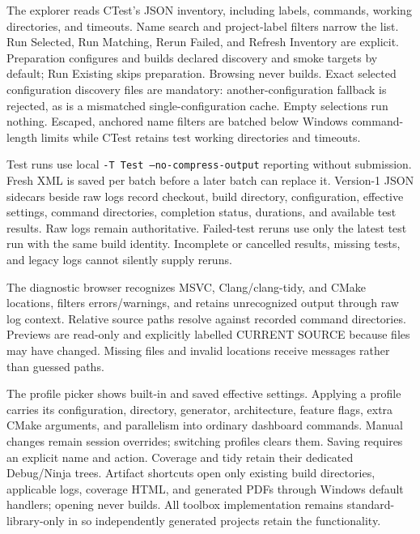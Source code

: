 The explorer reads CTest's JSON inventory, including labels, commands, working
directories, and timeouts. Name search and project-label filters narrow the list.
Run Selected, Run Matching, Rerun Failed, and Refresh Inventory are explicit.
Preparation configures and builds declared discovery and smoke targets by
default; Run Existing skips preparation. Browsing never builds. Exact selected
configuration discovery files are mandatory: another-configuration fallback is
rejected, as is a mismatched single-configuration cache. Empty selections run
nothing. Escaped, anchored name filters are batched below Windows command-length
limits while CTest retains test working directories and timeouts.

Test runs use local \texttt{-T Test --no-compress-output} reporting without
submission. Fresh XML is saved per batch before a later batch can replace it.
Version-1 JSON sidecars beside raw logs record checkout, build directory,
configuration, effective settings, command directories, completion status,
durations, and available test results. Raw logs remain authoritative. Failed-test
reruns use only the latest test run with the same build identity. Incomplete or
cancelled results, missing tests, and legacy logs cannot silently supply reruns.

The diagnostic browser recognizes MSVC, Clang/clang-tidy, and CMake locations,
filters errors/warnings, and retains unrecognized output through raw log context.
Relative source paths resolve against recorded command directories. Previews are
read-only and explicitly labelled CURRENT SOURCE because files may have changed.
Missing files and invalid locations receive messages rather than guessed paths.

The profile picker shows built-in and saved effective settings. Applying a profile
carries its configuration, directory, generator, architecture, feature flags,
extra CMake arguments, and parallelism into ordinary dashboard commands. Manual
changes remain session overrides; switching profiles clears them. Saving requires
an explicit name and action. Coverage and tidy retain their dedicated Debug/Ninja
trees. Artifact shortcuts open only existing build directories, applicable logs,
coverage HTML, and generated PDFs through Windows default handlers; opening never
builds. All toolbox implementation remains standard-library-only in
 so independently generated projects retain the functionality.

